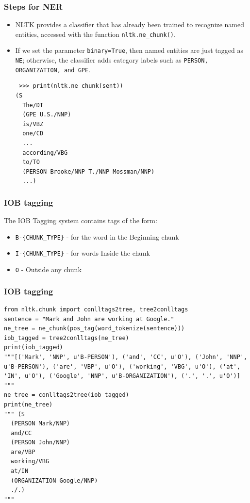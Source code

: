 \begin{frame}[fragile]\frametitle{Steps for NER}
  \begin{itemize}
  \item NLTK provides a classifier that has already been trained to recognize named entities, accessed with the function \lstinline|nltk.ne_chunk()|. 
\item If we set the parameter \lstinline|binary=True|, then named entities are just tagged as \lstinline|NE|; otherwise, the classifier adds category labels such as \lstinline|PERSON, ORGANIZATION, and GPE|.
  \begin{lstlisting}
 >>> print(nltk.ne_chunk(sent)) 
(S
  The/DT
  (GPE U.S./NNP)
  is/VBZ
  one/CD
  ...
  according/VBG
  to/TO
  (PERSON Brooke/NNP T./NNP Mossman/NNP)
  ...)
  \end{lstlisting}
  \end{itemize}
\end{frame}

\begin{frame}[fragile]\frametitle{IOB tagging}
The IOB Tagging system contains tags of the form:
  \begin{itemize}
  \item \lstinline|B-{CHUNK_TYPE}| - for the word in the Beginning chunk
  \item \lstinline|I-{CHUNK_TYPE}| - for words Inside the chunk
  \item \lstinline|O| - Outside any chunk
  \end{itemize}

\end{frame}

\begin{frame}[fragile]\frametitle{IOB tagging}
  \begin{lstlisting}
from nltk.chunk import conlltags2tree, tree2conlltags
sentence = "Mark and John are working at Google."
ne_tree = ne_chunk(pos_tag(word_tokenize(sentence)))
iob_tagged = tree2conlltags(ne_tree)
print(iob_tagged)
"""[('Mark', 'NNP', u'B-PERSON'), ('and', 'CC', u'O'), ('John', 'NNP', u'B-PERSON'), ('are', 'VBP', u'O'), ('working', 'VBG', u'O'), ('at', 'IN', u'O'), ('Google', 'NNP', u'B-ORGANIZATION'), ('.', '.', u'O')]
"""
ne_tree = conlltags2tree(iob_tagged)
print(ne_tree)
""" (S
  (PERSON Mark/NNP)
  and/CC
  (PERSON John/NNP)
  are/VBP
  working/VBG
  at/IN
  (ORGANIZATION Google/NNP)
  ./.)
"""
\end{lstlisting}
\end{frame}

